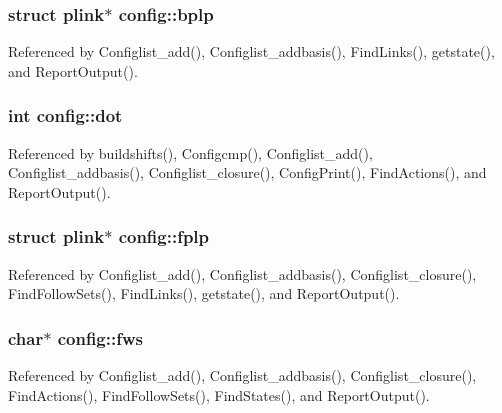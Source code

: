\hypertarget{structconfig_ad90a39b67a446352a0557937a4e65d1c}{
\subsubsection[{bplp}]{\setlength{\rightskip}{0pt plus 5cm}struct {\bf plink}$\ast$ config\-::bplp}}\label{structconfig_ad90a39b67a446352a0557937a4e65d1c}


Referenced by Configlist\-\_\-add(), Configlist\-\_\-addbasis(), Find\-Links(), getstate(), and Report\-Output().

\hypertarget{structconfig_aa628525de6016f3bd01f49499ef05cb3}{
\subsubsection[{dot}]{\setlength{\rightskip}{0pt plus 5cm}int config\-::dot}}\label{structconfig_aa628525de6016f3bd01f49499ef05cb3}


Referenced by buildshifts(), Configcmp(), Configlist\-\_\-add(), Configlist\-\_\-addbasis(), Configlist\-\_\-closure(), Config\-Print(), Find\-Actions(), and Report\-Output().

\hypertarget{structconfig_ab9b1fbd290f96b7eeed8bd650258f128}{
\subsubsection[{fplp}]{\setlength{\rightskip}{0pt plus 5cm}struct {\bf plink}$\ast$ config\-::fplp}}\label{structconfig_ab9b1fbd290f96b7eeed8bd650258f128}


Referenced by Configlist\-\_\-add(), Configlist\-\_\-addbasis(), Configlist\-\_\-closure(), Find\-Follow\-Sets(), Find\-Links(), getstate(), and Report\-Output().

\hypertarget{structconfig_ae14004c0e734d7865cf064a96361918f}{
\subsubsection[{fws}]{\setlength{\rightskip}{0pt plus 5cm}char$\ast$ config\-::fws}}\label{structconfig_ae14004c0e734d7865cf064a96361918f}


Referenced by Configlist\-\_\-add(), Configlist\-\_\-addbasis(), Configlist\-\_\-closure(), Find\-Actions(), Find\-Follow\-Sets(), Find\-States(), and Report\-Output().

